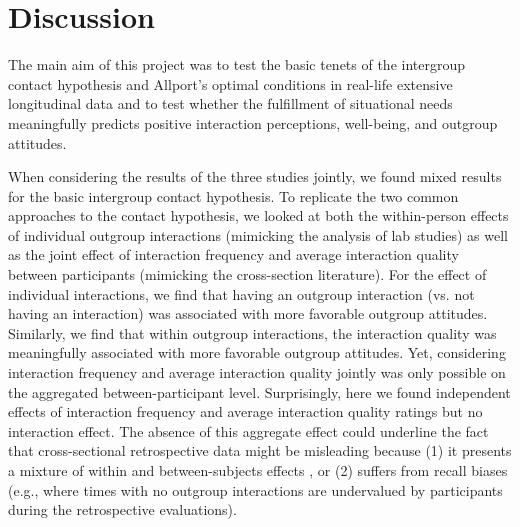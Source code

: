 \documentclass[man, 12pt, a4paper, mask]{apa7}
\theoremstyle{break}
\theoremstyle{plain}
\begin{document}


\section{Discussion}
The main aim of this project was to test the basic tenets of the intergroup contact hypothesis and Allport's optimal conditions in real-life extensive longitudinal data and to test whether the fulfillment of situational needs meaningfully predicts positive interaction perceptions, well-being, and outgroup attitudes. 

When considering the results of the three studies jointly, we found mixed results for the basic intergroup contact hypothesis. To replicate the two common approaches to the contact hypothesis, we looked at both the within-person effects of individual outgroup interactions (mimicking the analysis of lab studies) as well as the joint effect of interaction frequency and average interaction quality between participants (mimicking the cross-section literature). For the effect of individual interactions, we find that having an outgroup interaction (vs. not having an interaction) was associated with more favorable outgroup attitudes. Similarly, we find that within outgroup interactions, the interaction quality was meaningfully associated with more favorable outgroup attitudes. Yet, considering interaction frequency and average interaction quality jointly was only possible on the aggregated between-participant level. Surprisingly, here we found independent effects of interaction frequency and average interaction quality ratings but no interaction effect. The absence of this aggregate effect could underline the fact that cross-sectional retrospective data might be misleading because (1) it presents a mixture of within and between-subjects effects \citep[][]{Hamaker2020}, or (2) suffers from recall biases (e.g., where times with no outgroup interactions are undervalued by participants during the retrospective evaluations). 
\end{document}
